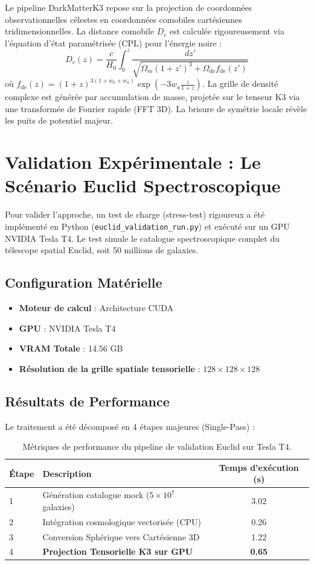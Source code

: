 \documentclass[11pt,a4paper]{article}
\begin{document}
Le pipeline DarkMatterK3 repose sur la projection de coordonnées observationnelles célestes en coordonnées comobiles cartésiennes tridimensionnelles. La distance comobile $D_c$ est calculée rigoureusement via l'équation d'état paramétrisée (CPL) pour l'énergie noire :
\begin{equation}
    D_c(z) = \frac{c}{H_0} \int_{0}^{z} \frac{dz'}{\sqrt{\Omega_{m}(1+z')^3 + \Omega_{\text{de}} f_{\text{de}}(z')}}
\end{equation}
où $f_{\text{de}}(z) = (1+z)^{3(1+w_0+w_a)} \exp\left(-3w_a \frac{z}{1+z}\right)$.
La grille de densité complexe est générée par accumulation de masse, projetée sur le tenseur K3 via une transformée de Fourier rapide (FFT 3D). La brisure de symétrie locale révèle les puits de potentiel majeur.

\section{Validation Expérimentale : Le Scénario Euclid Spectroscopique}

Pour valider l'approche, un test de charge (stress-test) rigoureux a été implémenté en Python (\texttt{euclid\_validation\_run.py}) et exécuté sur un GPU NVIDIA Tesla T4. Le test simule le catalogue spectroscopique complet du télescope spatial Euclid, soit 50 millions de galaxies.

\subsection{Configuration Matérielle}
\begin{itemize}
    \item \textbf{Moteur de calcul} : Architecture CUDA
    \item \textbf{GPU} : NVIDIA Tesla T4
    \item \textbf{VRAM Totale} : 14.56 GB
    \item \textbf{Résolution de la grille spatiale tensorielle} : $128 \times 128 \times 128$
\end{itemize}

\subsection{Résultats de Performance}
Le traitement a été décomposé en 4 étapes majeures (Single-Pass) :
\begin{table}[h]
    \centering
    \begin{tabular}{@{}llc@{}}
    \toprule
    \textbf{Étape} & \textbf{Description} & \textbf{Temps d'exécution (s)} \\ \midrule
    1 & Génération catalogue mock ($5 \times 10^7$ galaxies) & 3.02 \\
    2 & Intégration cosmologique vectorisée (CPU) & 0.26 \\
    3 & Conversion Sphérique vers Cartésienne 3D & 1.22 \\
    4 & \textbf{Projection Tensorielle K3 sur GPU} & \textbf{0.65} \\ \bottomrule
    \end{tabular}
    \caption{Métriques de performance du pipeline de validation Euclid sur Tesla T4.}
\end{table}
\end{document}
